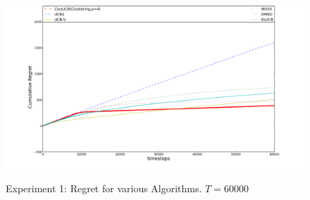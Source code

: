 




\begin{figure}[!tbp]
\centering
\begin{minipage}[b]{0.4\textwidth}

\includegraphics[width=\textwidth]{img/ClusUCB_variousAlgo.png}
\label{fig:1}
\caption{Experiment 1: Regret for various Algorithms. $T=60000$}
\end{minipage}
\hspace{0.1em}
\end{figure}

